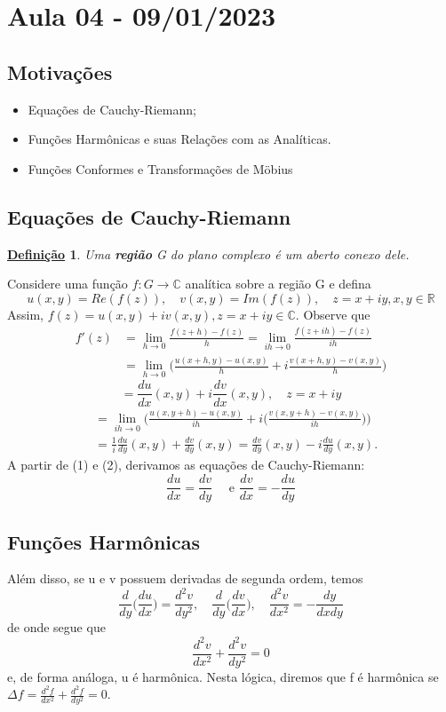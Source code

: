 \documentclass{article}
\newtheorem*{def*}{\underline{Defini\c c\~ao}}
\begin{document}
  \section{Aula 04 - 09/01/2023}
  \subsection{Motiva\c c\~oes}
  \begin{itemize}
    \item Equa\c c\~oes de Cauchy-Riemann;
    \item Fun\c c\~oes Harm\^onicas e suas Rela\c c\~oes com as Anal\'iticas.
    \item Fun\c c\~oes Conformes e Transforma\c c\~oes de M\"{o}bius
  \end{itemize}
  \subsection{Equa\c c\~oes de Cauchy-Riemann}
  \begin{def*}
    Uma \textbf{regi\~ao} G do plano complexo \'e um aberto conexo dele.
  \end{def*}
  Considere uma fun\c c\~ao $f:G\rightarrow \mathbb{C}$ anal\'itica sobre a regi\~ao G e defina
  $$
  u(x, y) = Re(f(z)), \quad v(x, y) = Im(f(z)), \quad z=x+iy, x, y\in \mathbb{R}
  $$
  Assim, $f(z) = u(x, y) + iv(x, y), z=x+iy\in \mathbb{C}.$ Observe que 
  \begin{align*} 
    f'(z) &= \lim _{h\to{0}}\frac{f(z+h) - f(z)}{h} = \lim _{ih\to{0}}\frac{f(z+ih) - f(z)}{ih} \\
          &= \lim _{h\to{0}}\biggl(\frac{u(x+h, y) - u(x, y)}{h} + i\frac{v(x + h, y) - v(x, y)}{h}\biggr)
  \end{align*} 
  \begin{equation}
    = \frac{du}{dx}(x, y) + i \frac{dv}{dx}(x, y), \quad z = x + iy  
  \end{equation}
  \begin{align}
 &= \lim _{ih\to{0}}\biggl(\frac{u(x, y+h) - u(x, y)}{ih} + i\biggl(\frac{v(x, y+h) - v(x, y)}{ih}\biggr)\biggr) \nonumber\\
 &= \frac{1}{i}\frac{du}{dy}(x, y) + \frac{dv}{dy}(x, y) = \frac{dv}{dy}(x, y) - i \frac{du}{dy}(x, y).
  \end{align}
  A partir de (1) e (2), derivamos as equa\c c\~oes de Cauchy-Riemann:
  $$
  \boxed{\frac{du}{dx}=\frac{dv}{dy} \quad \text{ e } \frac{dv}{dx} = -\frac{du}{dy}}
  $$
  \subsection{Fun\c c\~oes Harm\^onicas}
  Al\'em disso, se u e v possuem derivadas de segunda ordem, temos
  $$
  \frac{d}{dy}\biggl(\frac{du}{dx}\biggr) = \frac{d^2v}{dy^2}, \quad \frac{d}{dy}\biggl(\frac{dv}{dx}\biggr), \quad \frac{d^2v}{dx^2} = -\frac{dy}{dxdy}
  $$
  de onde segue que 
  $$
  \frac{d^2v}{dx^2} + \frac{d^2v}{dy^2} = 0
  $$
  e, de forma an\'aloga, u \'e harm\^onica. Nesta l\'ogica, diremos que f \'e harm\^onica
  se $\Delta f = \frac{d^2f}{dx^2} + \frac{d^2f}{dy^2} = 0.$
\end{document}
